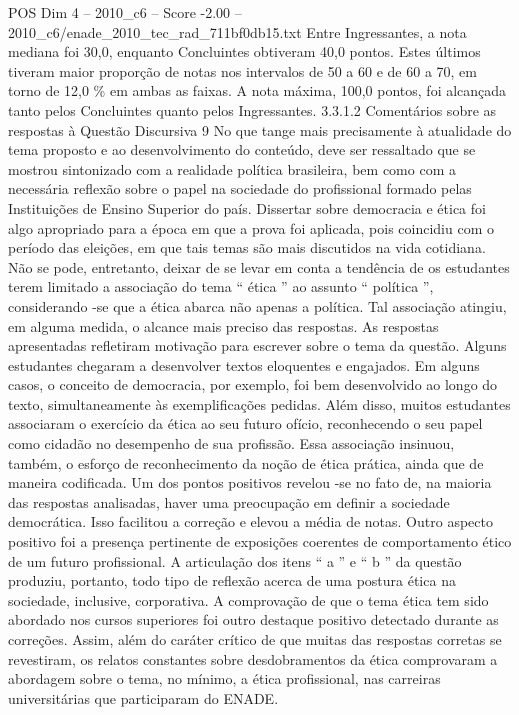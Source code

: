 \begin{textsample}{POS Dim 4 – 2010\_c6 – Score -2.00 – 2010\_c6/enade\_2010\_tec\_rad\_711bf0db15.txt}
Entre Ingressantes, a nota mediana foi 30,0, enquanto Concluintes obtiveram 40,0 pontos.
Estes últimos tiveram maior proporção de notas nos intervalos de 50 a 60 e de 60 a 70, em torno de 12,0 \% em ambas as faixas.
A nota máxima, 100,0 pontos, foi alcançada tanto pelos Concluintes quanto pelos Ingressantes. 3.3.1.2 Comentários sobre as respostas à Questão Discursiva 9 No que tange mais precisamente à atualidade do tema proposto e ao desenvolvimento do conteúdo, deve ser ressaltado que se mostrou sintonizado com a realidade política brasileira, bem como com a necessária reflexão sobre o papel na sociedade do profissional formado pelas Instituições de Ensino Superior do país.
Dissertar sobre democracia e ética foi algo apropriado para a época em que a prova foi aplicada, pois coincidiu com o período das eleições, em que tais temas são mais discutidos na vida cotidiana.
Não se pode, entretanto, deixar de se levar em conta a tendência de os estudantes terem limitado a associação do tema “ ética ” ao assunto “ política ”, considerando -se que a ética abarca não apenas a política.
Tal associação atingiu, em alguma medida, o alcance mais preciso das respostas.
As respostas apresentadas refletiram motivação para escrever sobre o tema da questão.
Alguns estudantes chegaram a desenvolver textos eloquentes e engajados.
Em alguns casos, o conceito de democracia, por exemplo, foi bem desenvolvido ao longo do texto, simultaneamente às exemplificações pedidas.
Além disso, muitos estudantes associaram o exercício da ética ao seu futuro ofício, reconhecendo o seu papel como cidadão no desempenho de sua profissão.
Essa associação insinuou, também, o esforço de reconhecimento da noção de ética prática, ainda que de maneira codificada.
Um dos pontos positivos revelou -se no fato de, na maioria das respostas analisadas, haver uma preocupação em definir a sociedade democrática.
Isso facilitou a correção e elevou a média de notas.
Outro aspecto positivo foi a presença pertinente de exposições coerentes de comportamento ético de um futuro profissional.
A articulação dos itens “ a ” e “ b ” da questão produziu, portanto, todo tipo de reflexão acerca de uma postura ética na sociedade, inclusive, corporativa.
A comprovação de que o tema ética tem sido abordado nos cursos superiores foi outro destaque positivo detectado durante as correções.
Assim, além do caráter crítico de que muitas das respostas corretas se revestiram, os relatos constantes sobre desdobramentos da ética comprovaram a abordagem sobre o tema, no mínimo, a ética profissional, nas carreiras universitárias que participaram do ENADE.

\end{textsample}
